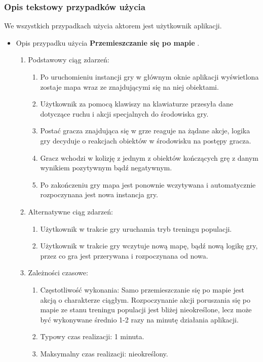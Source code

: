 \subsubsection{Opis tekstowy przypadków użycia}
\begin{par}
	We wszystkich przypadkach użycia aktorem jest użytkownik aplikacji.
	\begin{itemize}

	\item
	Opis przypadku użycia {\bf Przemieszczanie się po mapie }.
	\begin{enumerate}
	\item Podstawowy ciąg zdarzeń:
		\begin{enumerate}
		\item Po uruchomieniu instancji gry w głównym oknie aplikacji wyświetlona zostaje mapa wraz ze znajdującymi się na niej obiektami.
		\item Użytkownik za pomocą klawiszy na klawiaturze przesyła dane dotyczące ruchu i akcji specjalnych do środowiska gry.
		\item Postać gracza znajdująca się w grze reaguje na żądane akcje, logika gry decyduje o reakcjach obiektów w środowisku na postępy gracza.
		\item Gracz wchodzi w kolizję z jednym z obiektów kończących grę z danym wynikiem pozytywnym bądź negatywnym.
		\item Po zakończeniu gry mapa jest ponownie wczytywana i automatycznie rozpoczynana jest nowa instancja gry.
		\end{enumerate}
	\item Alternatywne ciąg zdarzeń:
		\begin{enumerate}
		\item Użytkownik w trakcie gry uruchamia tryb treningu populacji.
		\item Użytkownik w trakcie gry wczytuje nową mapę, bądź nową logikę gry, przez co gra jest przerywana i rozpoczynana od nowa.
		\end{enumerate}
	\item Zależności czasowe:
		\begin{enumerate}
		\item Częstotliwość wykonania: Samo przemieszczanie się po mapie jest akcją o charakterze ciągłym. 
		Rozpoczynanie akcji poruszania się po mapie ze stanu treningu populacji jest bliżej nieokreślone, lecz może być wykonywane średnio 1-2 razy na minutę działania aplikacji.
		\item Typowy czas realizacji: 1 minuta.
		\item Maksymalny czas realizacji: nieokreślony.

\end{enumerate}
\end{enumerate}
\end{itemize}
\end{par}
